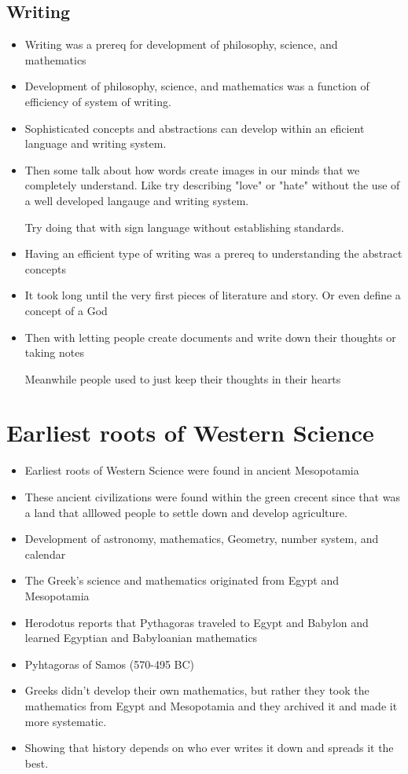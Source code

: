 \documentclass{article}
\begin{document}
\subsection{Writing}
\begin{itemize}
  \item Writing was a prereq for development of philosophy, science, and mathematics
  \item Development of philosophy, science, and mathematics
    was a function of efficiency of system of writing.
  \item Sophisticated concepts and abstractions can develop within
    an eficient language and writing system.
  \item Then some talk about how words create images in our minds
    that we completely understand. Like try describing
    "love" or "hate" without the use of a well developed langauge
    and writing system.

    Try doing that with sign language without establishing standards.
  \item Having an efficient type of writing was a prereq to understanding
    the abstract concepts
  \item It took long until the very first pieces of literature and
    story. Or even define a concept of a God
  \item Then with letting people create documents and write
    down their thoughts or taking notes

    Meanwhile people used to just keep their thoughts in their hearts
\end{itemize}

\section{Earliest roots of Western Science}
\begin{itemize}
  \item Earliest roots of Western Science were found in ancient Mesopotamia
  \item These ancient civilizations were found within the green crecent
    since that was a land that alllowed people to settle down
    and develop agriculture.
  \item Development of astronomy, mathematics, Geometry, number system, and calendar
  \item The Greek's science and mathematics originated from Egypt and Mesopotamia
  \item Herodotus reports that Pythagoras traveled to Egypt and Babylon and learned Egyptian and Babyloanian mathematics
  \item Pyhtagoras of Samos (570-495 BC)
  \item Greeks didn't develop their own mathematics, but rather
    they took the mathematics from Egypt and Mesopotamia
    and they archived it and made it more systematic.
  \item Showing that history depends on who ever writes it down
    and spreads it the best.
\end{itemize}
\end{document}
